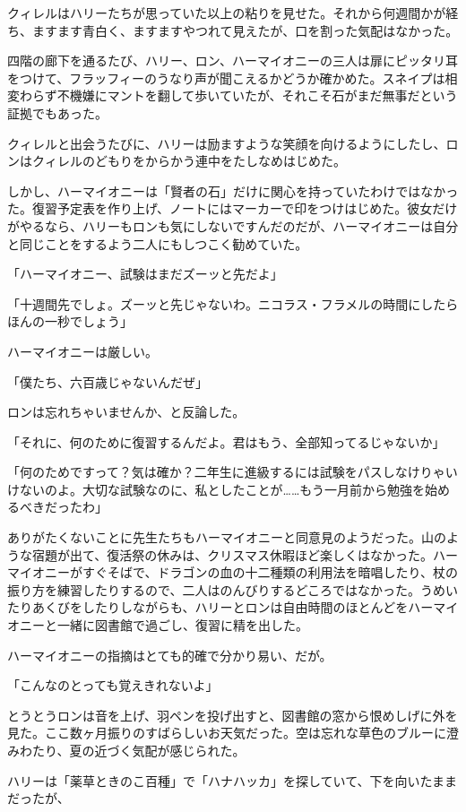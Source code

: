 \documentclass[10pt,a4paper]{article}
\begin{document}
\begin{CJK}{UTF8}{min}
クィレルはハリーたちが思っていた以上の粘りを見せた。それから何週間かが経ち、ますます青白く、ますますやつれて見えたが、口を割った気配はなかった。

四階の廊下を通るたび、ハリー、ロン、ハーマイオニーの三人は扉にピッタリ耳をつけて、フラッフィーのうなり声が聞こえるかどうか確かめた。スネイプは相変わらず不機嫌にマントを翻して歩いていたが、それこそ石がまだ無事だという証拠でもあった。

クィレルと出会うたびに、ハリーは励ますような笑顔を向けるようにしたし、ロンはクィレルのどもりをからかう連中をたしなめはじめた。

しかし、ハーマイオニーは「賢者の石」だけに関心を持っていたわけではなかった。復習予定表を作り上げ、ノートにはマーカーで印をつけはじめた。彼女だけがやるなら、ハリーもロンも気にしないですんだのだが、ハーマイオニーは自分と同じことをするよう二人にもしつこく勧めていた。

「ハーマイオニー、試験はまだズーッと先だよ」

「十週間先でしょ。ズーッと先じゃないわ。ニコラス・フラメルの時間にしたらほんの一秒でしょう」

ハーマイオニーは厳しい。

「僕たち、六百歳じゃないんだぜ」

ロンは忘れちゃいませんか、と反論した。

「それに、何のために復習するんだよ。君はもう、全部知ってるじゃないか」

「何のためですって？気は確か？二年生に進級するには試験をパスしなけりゃいけないのよ。大切な試験なのに、私としたことが……もう一月前から勉強を始めるべきだったわ」

ありがたくないことに先生たちもハーマイオニーと同意見のようだった。山のような宿題が出て、復活祭の休みは、クリスマス休暇ほど楽しくはなかった。ハーマイオニーがすぐそばで、ドラゴンの血の十二種類の利用法を暗唱したり、杖の振り方を練習したりするので、二人はのんびりするどころではなかった。うめいたりあくびをしたりしながらも、ハリーとロンは自由時間のほとんどをハーマイオニーと一緒に図書館で過ごし、復習に精を出した。

ハーマイオニーの指摘はとても的確で分かり易い、だが。

「こんなのとっても覚えきれないよ」

とうとうロンは音を上げ、羽ペンを投げ出すと、図書館の窓から恨めしげに外を見た。ここ数ヶ月振りのすばらしいお天気だった。空は忘れな草色のブルーに澄みわたり、夏の近づく気配が感じられた。

ハリーは「薬草ときのこ百種」で「ハナハッカ」を探していて、下を向いたままだったが、


\end{CJK}
\end{document}
